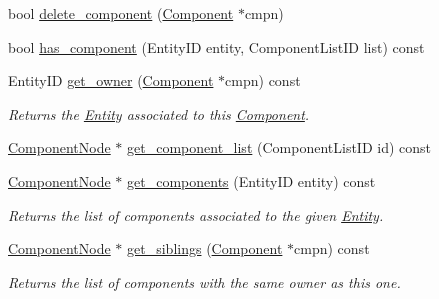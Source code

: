 \begin{DoxyCompactItemize}
bool \hyperlink{classnta_1_1ECS_ab24523ec53373bc159f67ee20d269975}{delete\+\_\+component} (\hyperlink{classnta_1_1Component}{Component} $\ast$cmpn)
\item 
bool \hyperlink{classnta_1_1ECS_a370204d3b816a67fe22147f00d0c9447}{has\+\_\+component} (Entity\+ID entity, Component\+List\+ID list) const
\item 
\mbox{\label{classnta_1_1ECS_a132c523df15f7657cf4aa35973031a31}} 
Entity\+ID \hyperlink{classnta_1_1ECS_a132c523df15f7657cf4aa35973031a31}{get\+\_\+owner} (\hyperlink{classnta_1_1Component}{Component} $\ast$cmpn) const
\begin{DoxyCompactList}\small\item\em Returns the \hyperlink{classnta_1_1Entity}{Entity} associated to this \hyperlink{classnta_1_1Component}{Component}. \end{DoxyCompactList}\item 
\hyperlink{structnta_1_1utils_1_1LinkedNode}{Component\+Node} $\ast$ \hyperlink{classnta_1_1ECS_abd195033b6216d2dc8bf274a0ca82e4e}{get\+\_\+component\+\_\+list} (Component\+List\+ID id) const
\item 
\mbox{\label{classnta_1_1ECS_a5b2cc98462e1e510700ed7aab523cab1}} 
\hyperlink{structnta_1_1utils_1_1LinkedNode}{Component\+Node} $\ast$ \hyperlink{classnta_1_1ECS_a5b2cc98462e1e510700ed7aab523cab1}{get\+\_\+components} (Entity\+ID entity) const
\begin{DoxyCompactList}\small\item\em Returns the list of components associated to the given \hyperlink{classnta_1_1Entity}{Entity}. \end{DoxyCompactList}\item 
\mbox{\label{classnta_1_1ECS_a407bb99dd9dded2074fa9a32170e66f6}} 
\hyperlink{structnta_1_1utils_1_1LinkedNode}{Component\+Node} $\ast$ \hyperlink{classnta_1_1ECS_a407bb99dd9dded2074fa9a32170e66f6}{get\+\_\+siblings} (\hyperlink{classnta_1_1Component}{Component} $\ast$cmpn) const
\begin{DoxyCompactList}\small\item\em Returns the list of components with the same owner as this one. \end{DoxyCompactList}\item 
\mbox{\label{classnta_1_1ECS_a0a5e6e7ee700a11a048bfaec497f4df4}} 

\end{DoxyCompactItemize}
